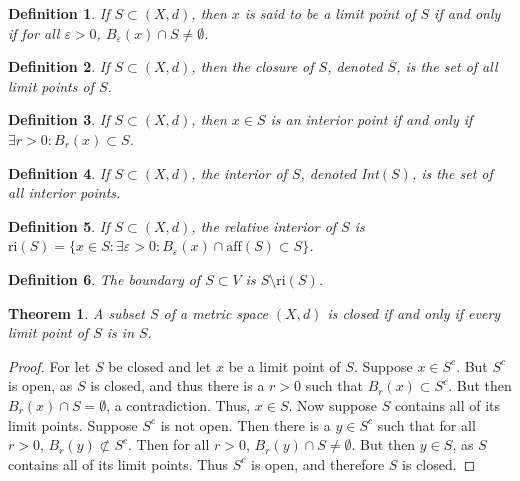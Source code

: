 \documentclass[12pt,oneside]{book}
\theoremstyle{mystyle}
\newtheorem{theorem}{Theorem}[section]
\newtheorem{definition}{Definition}[section]
\begin{document}
\begin{definition}
If $S\subset (X,d)$, then $x$ is said to be a limit point of $S$ if and only if for all $\varepsilon>0$, $B_{\varepsilon}(x)\cap S \ne \emptyset$.
\end{definition}

\begin{definition}
If $S\subset (X,d)$, then the closure of $S$, denoted $\overline{S}$, is the set of all limit points of $S$.
\end{definition}

\begin{definition}
If $S\subset (X,d)$, then $x\in S$ is an interior point if and only if $\exists r>0:B_{r}(x)\subset S$.
\end{definition}

\begin{definition}
If $S\subset (X,d)$, the interior of $S$, denoted Int$(S)$, is the set of all interior points.
\end{definition}

\begin{definition}
If $S\subset (X,d)$, the relative interior of $S$ is $\textrm{ri}(S)= \{x\in S:\exists \varepsilon>0:B_{\varepsilon}(x)\cap \textrm{aff}(S)\subset S\}$.
\end{definition}

\begin{definition}
The boundary of $S\subset V$ is $S\setminus \textrm{ri}(S)$.
\end{definition}

\begin{theorem}
A subset $S$ of a metric space $(X,d)$ is closed if and only if every limit point of $S$ is in $S$.
\end{theorem}
\begin{proof}
For let $S$ be closed and let $x$ be a limit point of $S$. Suppose $x\in S^c$. But $S^c$ is open, as $S$ is closed, and thus there is a $r>0$ such that $B_{r}(x)\subset S^c$. But then $B_{r}(x)\cap S = \emptyset$, a contradiction. Thus, $x\in S$. Now suppose $S$ contains all of its limit points. Suppose $S^c$ is not open. Then there is a $y\in S^c$ such that for all $r>0$, $B_{r}(y)\not \subset S^c$. Then for all $r>0$, $B_{r}(y)\cap S \ne \emptyset$. But then $y\in S$, as $S$ contains all of its limit points. Thus $S^c$ is open, and therefore $S$ is closed.
\end{proof}
\end{document}
